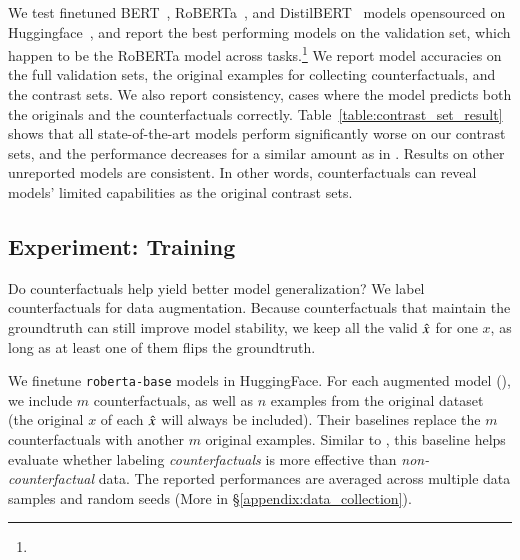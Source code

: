 We test finetuned BERT~\cite{devlin-etal-2019-bert}, RoBERTa~\cite{liu2019roberta}, and DistilBERT~\cite{Sanh2019DistilBERTAD} models opensourced on Huggingface~\cite{Wolf2019HuggingFacesTS}, and report the best performing models on the validation set, which happen to be the RoBERTa model across tasks.\footnote{
}
We report model accuracies on the full validation sets, the original examples for collecting counterfactuals, and the contrast sets.
We also report consistency, \ie cases where the model predicts both the originals and the counterfactuals correctly.
Table~\ref{table:contrast_set_result} shows that all state-of-the-art models perform significantly worse on our contrast sets, and the performance decreases for a similar amount as in \cite{gardner2020contrast}.
Results on other unreported models are consistent.
In other words, \sysname counterfactuals can reveal models' limited capabilities as the original contrast sets.


\subsection{Experiment: Training}

\label{subsec:augmentation}
Do \sysname counterfactuals help yield better model generalization? 
We label counterfactuals for data augmentation.
Because counterfactuals that maintain the groundtruth can still improve model stability, we keep all the valid $\hat{x}$ for one $x$, as long as at least one of them flips the groundtruth.

We finetune \texttt{roberta-base} models in HuggingFace.
For each augmented model (\maug), we include $m$ counterfactuals, as well as $n$ examples from the original dataset (the original $x$ of each $\hat{x}$ will always be included).
Their baselines \mcomp replace the $m$ counterfactuals with another $m$ original examples.
Similar to \citet{Khashabi2020MoreBF}, this baseline helps evaluate whether labeling \emph{counterfactuals} is more effective than \emph{non-counterfactual} data.
The reported performances are averaged across multiple data samples and random seeds (More in \S\ref{appendix:data_collection}).


